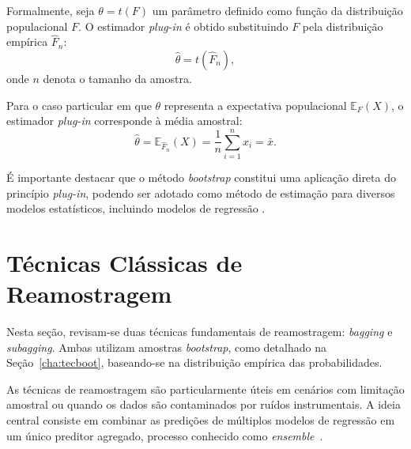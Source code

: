 Formalmente, seja $\theta = t(F)$ um parâmetro definido como função da distribuição populacional $F$. O estimador \textit{plug-in} é obtido substituindo $F$ pela distribuição empírica $\hat{F}_n$:
\begin{equation}
    \hat{\theta} = t(\hat{F}_n),
\end{equation}
onde $n$ denota o tamanho da amostra.

Para o caso particular em que $\theta$ representa a expectativa populacional $\mathbb{E}_F(X)$, o estimador \textit{plug-in} corresponde à média amostral:
\begin{equation}
    \hat{\theta} = \mathbb{E}_{\hat{F}_n}(X) = \frac{1}{n} \sum_{i=1}^{n} x_i = \bar{x}.
\end{equation}

É importante destacar que o método \textit{bootstrap} constitui uma aplicação direta do princípio \textit{plug-in}, podendo ser adotado como método de estimação para diversos modelos estatísticos, incluindo modelos de regressão \cite{EFRON:1997,FERNANDEZ:1999}.

\section{Técnicas Clássicas de Reamostragem}
\label{sec:teclarea}


Nesta seção, revisam-se duas técnicas fundamentais de reamostragem: \textit{bagging} e \textit{subagging}. Ambas utilizam amostras \textit{bootstrap}, como detalhado na Seção~\ref{cha:tecboot}, baseando-se na distribuição empírica das probabilidades.

As técnicas de reamostragem são particularmente úteis em cenários com limitação amostral ou quando os dados são contaminados por ruídos instrumentais. A ideia central consiste em combinar as predições de múltiplos modelos de regressão em um único preditor agregado, processo conhecido como \textit{ensemble}~\cite{Opitz1999,GALVAO:2006}.

